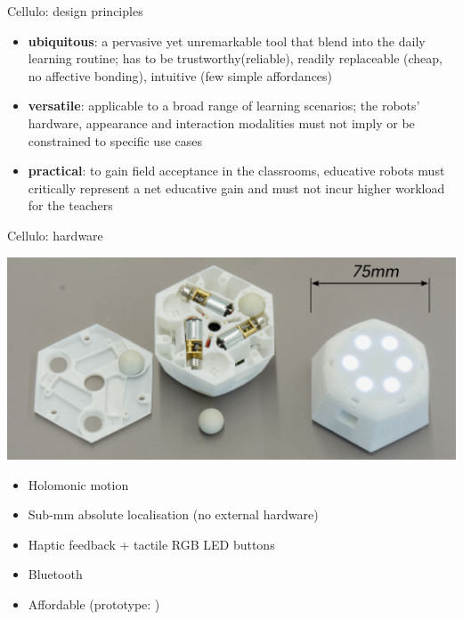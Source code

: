 \documentclass[compress]{beamer}
\begin{document}
{
 \begin{frame}{Cellulo: design principles}

     \begin{itemize}
         \item<1-> {\bf ubiquitous}: a pervasive yet unremarkable tool
             that blend into the daily learning routine; has to be
             trustworthy(\ie reliable), readily replaceable (\ie cheap, no
             affective bonding), intuitive (\ie few simple affordances)

         \item<2-> {\bf versatile}: applicable to a broad range of learning
             scenarios; the robots’ hardware, appearance and interaction
             modalities must not imply or be constrained to specific use cases

         \item<3-> {\bf practical}: to gain field
             acceptance in the classrooms, educative robots must critically
             represent a net educative gain and must not incur higher
             workload for the teachers
     \end{itemize}

 \end{frame}
}


 \begin{frame}{Cellulo: hardware}
     \begin{center}
         \includegraphics[width=0.8\linewidth]{cellulo/hardware-design}
     \end{center}
     \begin{itemize}
         \item Holomonic motion
         \item Sub-mm absolute localisation (no external hardware)
         \item Haptic feedback + tactile RGB LED buttons 
         \item Bluetooth
         \item<2> Affordable (prototype: )
     \end{itemize}
 \end{frame}
\end{document}
